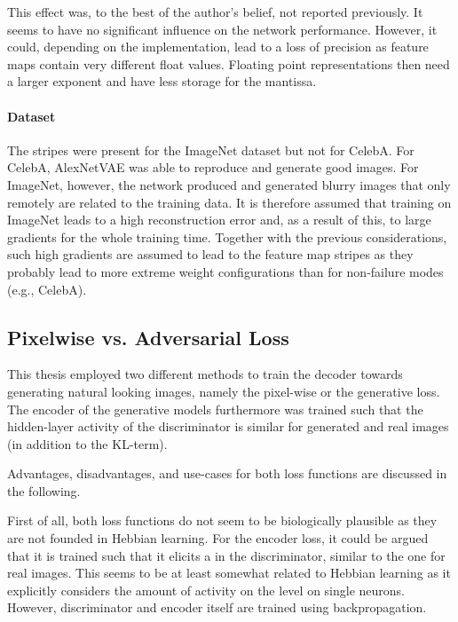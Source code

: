 This effect was, to the best of the author's belief, not reported previously.
It seems to have no significant influence on the network performance.
However, it could, depending on the implementation, lead to a loss of precision as feature maps contain very different float values.
Floating point representations then need a larger exponent and have less storage for the mantissa.

\paragraph{Dataset}
The stripes were present for the ImageNet dataset but not for CelebA.
For CelebA, AlexNetVAE was able to reproduce and generate good images.
For ImageNet, however, the network produced and generated blurry images that only remotely are related to the training data.
It is therefore assumed that training on ImageNet leads to a high reconstruction error and, as a result of this, to large gradients for the whole training time.
Together with the previous considerations, such high gradients are assumed to lead to the feature map stripes as they probably lead to more extreme weight configurations than for non-failure modes (e.g., CelebA).

\subsection{Pixelwise vs. Adversarial Loss}\label{subsec:pixelwise-vs.-adversarial-loss}
This thesis employed two different methods to train the decoder towards generating natural looking images, namely the pixel-wise or the generative loss.
The encoder of the generative models furthermore was trained such that the hidden-layer activity of the discriminator is similar for generated and real images (in addition to the KL-term).

Advantages, disadvantages, and use-cases for both loss functions are discussed in the following.

First of all, both loss functions do not seem to be biologically plausible as they are not founded in Hebbian learning.
For the encoder loss, it could be argued that it is trained such that it elicits a  in the discriminator, similar to the one for real images.
This  seems to be at least somewhat related to Hebbian learning as it explicitly considers the amount of activity on the level on single neurons.
However, discriminator and encoder itself are trained using backpropagation.

